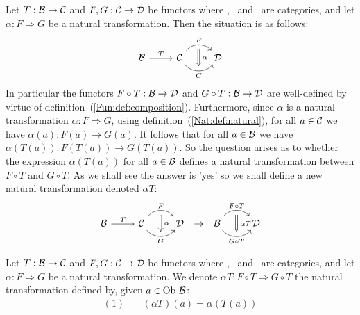 Let $T:\mbox{$\cal B$}\to\mbox{$\cal C$}$ and $F,G:\mbox{$\cal C$}\to\mbox{$\cal D$}$ be functors where \Bat, \Cat\
and \Dat\ are categories, and let $\alpha:F\Rightarrow G$ be a natural 
transformation. Then the situation is as follows: 
    \[
        \begin{tikzcd}
            \Bat \arrow[r,"T"]
            & \Cat \arrow[r, "F", bend left  = 50, ""{name=U, below}]
                 \arrow[r, swap, "G", bend right = 50, ""{name=D, above}]
              & \Dat
            \arrow[Rightarrow, "\,\alpha", from = U, to = D]
        \end{tikzcd}
    \] 
In particular the functors $F\circ T:\mbox{$\cal B$}\to\mbox{$\cal D$}$ and $G\circ T:\mbox{$\cal B$}\to\mbox{$\cal D$}$
are well-defined by virtue of definition~(\ref{Fun:def:composition}).
Furthermore, since $\alpha$ is a natural transformation $\alpha:F\Rightarrow G$,
using definition~(\ref{Nat:def:natural}), for all $a\in\mbox{$\cal C$}$ we have 
$\alpha(a):F(a)\to G(a)$. It follows that for all $a\in\mbox{$\cal B$}$ we have 
$\alpha (T(a)) : F(T(a))\to G(T(a))$. So the question arises as to whether
the expression $\alpha(T(a))$ for all $a\in\mbox{$\cal B$}$ defines a natural
transformation between $F\circ T$ and $G\circ T$. As we shall see the 
answer is 'yes' so we shall define a new natural transformation denoted 
$\alpha T$:
    \[
        \begin{tikzcd}
            \Bat \arrow[r,"T"]
            & \Cat \arrow[r, "F", bend left  = 50, ""{name=U, below}]
                 \arrow[r, swap, "G", bend right = 50, ""{name=D, above}]
              & \Dat
            \arrow[Rightarrow, "\,\alpha", from = U, to = D]
        \end{tikzcd}
        \ \to\ 
        \begin{tikzcd}
            \Bat \arrow[r, "F\circ T", bend left  = 50, ""{name=U, below}]
                 \arrow[r, swap, "G\circ T", bend right = 50, ""{name=D, above}]
              & \Dat
            \arrow[Rightarrow, "\,\alpha T", from = U, to = D]
        \end{tikzcd}
    \]

\begin{defin}\label{Nat:def:rightmul}
    Let $T:\mbox{$\cal B$}\to\mbox{$\cal C$}$ and $F,G:\mbox{$\cal C$}\to\mbox{$\cal D$}$ be functors where \Bat, \Cat\
    and \Dat\ are categories, and let $\alpha:F\Rightarrow G$ be a natural 
    transformation. We denote $\alpha T: F\circ T\Rightarrow G\circ T$ the 
    natural transformation defined by, given $a\in\mbox{\rm Ob}\ \mbox{$\cal B$}$:
        \begin{eqnarray*}
            (1)&\ &(\alpha T)(a) = \alpha (T(a))
        \end{eqnarray*}
\end{defin}  


